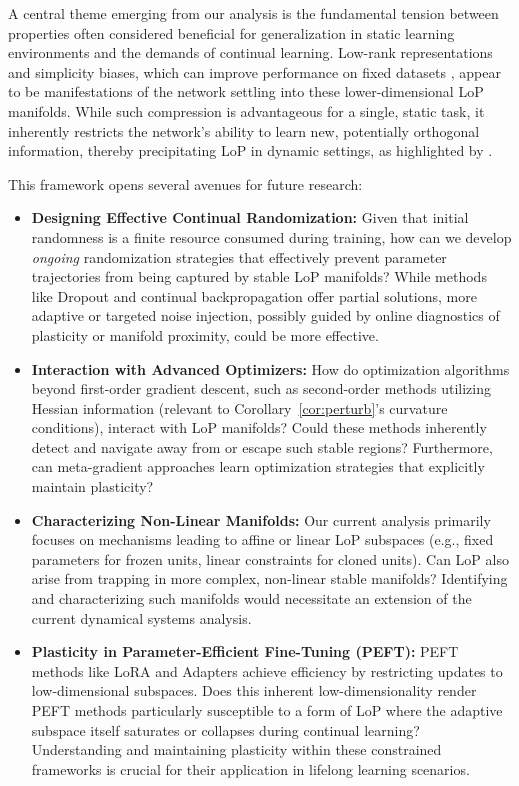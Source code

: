 \documentclass{article}
\begin{document}
A central theme emerging from our analysis is the fundamental tension between properties often considered beneficial for generalization in static learning environments and the demands of continual learning. Low-rank representations and simplicity biases, which can improve performance on fixed datasets \citep{huh2022lowrank, papyan2020prevalence, zhang2017understanding}, appear to be manifestations of the network settling into these lower-dimensional LoP manifolds. While such compression is advantageous for a single, static task, it inherently restricts the network's ability to learn new, potentially orthogonal information, thereby precipitating LoP in dynamic settings, as highlighted by \citet{dohare2024loss}.

This framework opens several avenues for future research:
\begin{itemize}[nosep]
    \item \textbf{Designing Effective Continual Randomization:} Given that initial randomness is a finite resource consumed during training, how can we develop \emph{ongoing} randomization strategies that effectively prevent parameter trajectories from being captured by stable LoP manifolds? While methods like Dropout \citep{srivastava2014dropout} and continual backpropagation \citep{dohare2024loss} offer partial solutions, more adaptive or targeted noise injection, possibly guided by online diagnostics of plasticity or manifold proximity, could be more effective.
    \item \textbf{Interaction with Advanced Optimizers:} How do optimization algorithms beyond first-order gradient descent, such as second-order methods utilizing Hessian information (relevant to Corollary~\ref{cor:perturb}'s curvature conditions), interact with LoP manifolds? Could these methods inherently detect and navigate away from or escape such stable regions? Furthermore, can meta-gradient approaches \citep{sutton1992gain} learn optimization strategies that explicitly maintain plasticity?
    \item \textbf{Characterizing Non-Linear Manifolds:} Our current analysis primarily focuses on mechanisms leading to affine or linear LoP subspaces (e.g., fixed parameters for frozen units, linear constraints for cloned units). Can LoP also arise from trapping in more complex, non-linear stable manifolds? Identifying and characterizing such manifolds would necessitate an extension of the current dynamical systems analysis.
    \item \textbf{Plasticity in Parameter-Efficient Fine-Tuning (PEFT):} PEFT methods like LoRA \citep{hu2021lora} and Adapters \citep{houlsby2019parameter} achieve efficiency by restricting updates to low-dimensional subspaces. Does this inherent low-dimensionality render PEFT methods particularly susceptible to a form of LoP where the adaptive subspace itself saturates or collapses during continual learning? Understanding and maintaining plasticity within these constrained frameworks is crucial for their application in lifelong learning scenarios.

\end{itemize}
\end{document}
